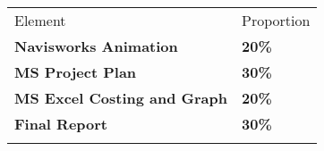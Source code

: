 \begin{table}[h!]
     \begin{center}
     \begin{tabular}{p{5cm}  p{5cm} }
     \toprule
      \textbf\large{Element} & \textbf\large{Proportion} \\ 
    \cmidrule(r){1-1}\cmidrule(lr){2-2}
      \textbf{Navisworks Animation} & \textbf{20\%}\\
      \textbf{MS Project Plan } & \textbf{30\%}\\
      \textbf{MS Excel Costing and Graph} & \textbf{20\%}\\
      \textbf{Final Report} & \textbf{30\%}\\     
      \\ \bottomrule
      \end{tabular}
      \label{tbl:markSchemeAsmt3}
      \end{center}
 \end{table}


